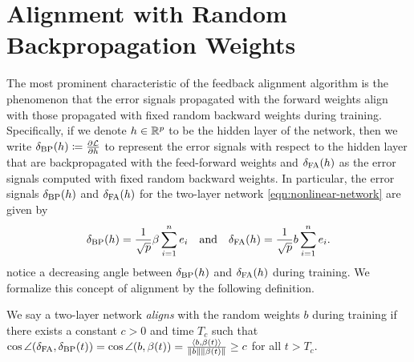 
\section{Alignment with Random Backpropagation Weights}\label{sec:alignment}

The most prominent characteristic of the feedback alignment algorithm is the phenomenon that the error signals propagated with the forward weights align with those propagated with fixed random backward weights during training. Specifically, if we denote $h\in \mathbb{R}^p$ to be the hidden layer of the network, then we write $\delta_\mathrm{BP}(h) \coloneqq \frac{\partial \mathcal{L}}{\partial h}$ to represent the error signals with respect to the hidden layer that are backpropagated with the feed-forward weights and $\delta_\mathrm{FA}(h)$ as the error signals computed with fixed random backward weights.
In particular, the error signals $\delta_\mathrm{BP}(h)$ and $\delta_\mathrm{FA}(h)$ for the two-layer network \eqref{eqn:nonlinear-network} are given by
\begin{equation*}
    \delta_\mathrm{BP}(h) = \frac{1}{\sqrt{p}}\beta\sum_{i=1}^ne_i \quad\text{and}\quad \delta_\mathrm{FA}(h) = \frac{1}{\sqrt{p}}b\sum_{i=1}^ne_i.
\end{equation*}
\citet{lillicrap2016random} notice a decreasing angle between $\delta_\mathrm{BP}(h)$ and $\delta_\mathrm{FA}(h)$ during training. We formalize this concept of alignment by the following definition.
\begin{definition}\label{def:alignment}
    We say a two-layer network \textit{aligns} with the random weights $b$ during training if there exists a constant $c>0$ and time $T_c$ such that  $\cos\angle(\delta_\mathrm{FA}, \delta_\mathrm{BP}(t)) = \cos\angle(b, \beta(t)) = \frac{\langle b, \beta(t)\rangle}{\|b\|\|\beta(t)\|} \geq c$ for all $t > T_c$.
\end{definition}

